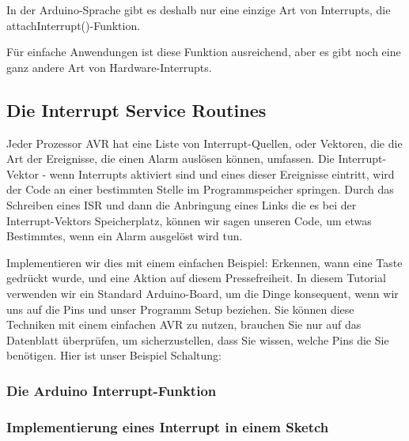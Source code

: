 In  der  Arduino-Sprache  gibt es deshalb nur eine einzige Art von 
Interrupts, die attachInterrupt()-Funktion. 

Für einfache Anwendungen ist diese Funktion ausreichend, aber es gibt noch eine ganz andere Art von
Hardware-Interrupts. 

\subsection{Die Interrupt Service Routines}


Jeder Prozessor AVR hat eine Liste von Interrupt-Quellen, oder Vektoren, die die Art der Ereignisse, die 
einen Alarm auslösen können, umfassen. 
Die Interrupt-Vektor - wenn Interrupts aktiviert sind und eines dieser Ereignisse eintritt, wird der Code an
einer bestimmten Stelle im Programmspeicher springen. Durch das Schreiben eines ISR und dann die 
Anbringung eines Links die es bei der Interrupt-Vektors Speicherplatz, können wir sagen unseren Code, 
um etwas Bestimmtes, wenn ein Alarm ausgelöst wird tun.

Implementieren wir dies mit einem einfachen Beispiel: Erkennen, wann eine Taste gedrückt wurde, und 
eine Aktion auf diesem Pressefreiheit. In diesem Tutorial verwenden wir ein Standard Arduino-Board, um 
die Dinge konsequent, wenn wir uns auf die Pins und unser Programm Setup beziehen. Sie können 
diese Techniken mit einem einfachen AVR zu nutzen, brauchen Sie nur auf das Datenblatt überprüfen, 
um sicherzustellen, dass Sie wissen, welche Pins die Sie benötigen. Hier ist unser Beispiel Schaltung:

\subsubsection{Die Arduino Interrupt-Funktion}

\subsubsection{Implementierung eines Interrupt in einem  Sketch}



